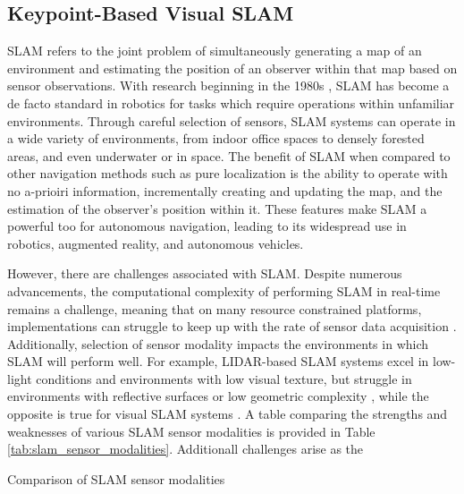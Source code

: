 \subsection{Keypoint-Based Visual SLAM}

SLAM refers to the joint problem of simultaneously generating a map of an environment and estimating the position of an observer within that map based on sensor observations. With research beginning in the 1980s \cite{smithEstimatingUncertainSpatial1988}, SLAM has become a de facto standard in robotics for tasks which require operations within unfamiliar environments. Through careful selection of sensors, SLAM systems can operate in a wide variety of environments, from indoor office spaces to densely forested areas, and even underwater or in space. The benefit of SLAM when compared to other navigation methods such as pure localization is the ability to operate with no a-prioiri information, incrementally creating and updating the map, and the estimation of the observer's position within it. These features make SLAM a powerful too for autonomous navigation, leading to its widespread use in robotics, augmented reality, and autonomous vehicles.

However, there are challenges associated with SLAM. Despite numerous advancements, the computational complexity of performing SLAM in real-time remains a challenge, meaning that on many resource constrained platforms, implementations can struggle to keep up with the rate of sensor data acquisition \cite{semenovaQuantitativeAnalysisSystem2022}. Additionally, selection of sensor modality impacts the environments in which SLAM will perform well. For example, LIDAR-based SLAM systems excel in low-light conditions and environments with low visual texture, but struggle in environments with reflective surfaces or low geometric complexity \cite{khanComparativeSurveyLiDARSLAM2021}, while the opposite is true for visual SLAM systems \cite{camposORBSLAM3AccurateOpenSource2021a}. A table comparing the strengths and weaknesses of various SLAM sensor modalities is provided in Table \ref{tab:slam_sensor_modalities}. Additionall challenges arise as the 

\begin{table}[ht!]
    \centering
    \caption{Comparison of SLAM sensor modalities}
    \label{tab:slam_sensor_modalities}
\end{table}